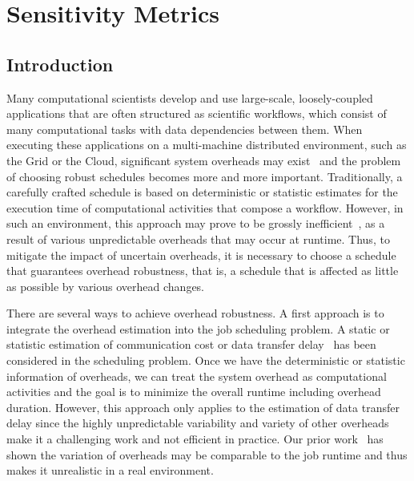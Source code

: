 
\section{Sensitivity Metrics}
\label{sec:sensitivity}
\subsection{Introduction}


Many computational scientists develop and use large-scale, loosely-coupled applications that are often structured as scientific workflows, which consist of many computational tasks with data dependencies between them. When executing these applications on a multi-machine distributed environment, such as the Grid or the Cloud, significant system overheads may exist~\cite{Chen2011, Prodan2008b, Dong2010, Yang03, WorkflowSim} and the problem of choosing robust schedules becomes more and more important. Traditionally, a carefully crafted schedule is based on deterministic or statistic estimates for the execution time of computational activities that compose a workflow. However, in such an environment, this approach may prove to be grossly inefficient~\cite{WorkflowSim}, as a result of various unpredictable overheads that may occur at runtime. 
Thus, to mitigate the impact of uncertain overheads, it is necessary to choose a schedule that guarantees overhead robustness, that is, a schedule that is affected as little as possible by various overhead changes.  

There are several ways to achieve overhead robustness. A first approach is to integrate the overhead estimation into the job scheduling problem. A static or statistic estimation of communication cost or data transfer delay~\cite{Dong2010, Yang03} has been considered in the scheduling problem. Once we have the deterministic or statistic information of overheads, we can treat the system overhead as computational activities and the goal is to minimize the overall runtime including overhead duration. However, this approach only applies to the estimation of data transfer delay since the highly unpredictable variability and variety of other overheads make it a challenging work and not efficient in practice. Our prior work~\cite{Chen} has shown the variation of overheads may be comparable to the job runtime and thus makes it unrealistic in a real environment.  

